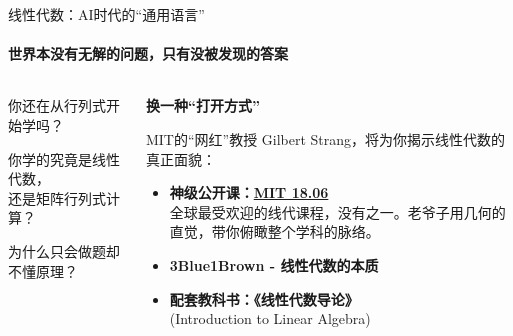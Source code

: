 \documentclass{beamer}
\newcommand{\hrefcol}[2]{\textcolor{cyan}{\href{#1}{#2}}}
\begin{document}
\begin{frame}{线性代数：AI时代的“通用语言”}
\framesubtitle{世界本没有无解的问题，只有没被发现的答案}
    \begin{columns}[T]
        \begin{column}{0.5\textwidth}
            \vspace{1cm}
            \huge 你还在从\alert{行列式}开始学吗？
            
            \vfill

            \begin{flushright}
                \large
                你学的究竟是\alert{线性代数}，\\
                还是矩阵行列式\alert{计算}？
            \end{flushright}

            \vfill
            
            \huge 为什么只会\alert{做题}却不懂\alert{原理}？

            \vfill
            

        \end{column}
        
        \begin{column}{0.5\textwidth}
            \begin{center}
                \Large \textbf{换一种“打开方式”}
            \end{center}
            \vspace{0.3cm}
            MIT的“网红”教授 Gilbert Strang，将为你揭示线性代数的真正面貌：
            
            \begin{itemize}
                \item \textbf{神级公开课：\hrefcol{https://ocw.mit.edu/courses/18-06sc-linear-algebra-fall-2011/pages/syllabus/}{MIT 18.06}} \\
                \small 全球最受欢迎的线代课程，没有之一。老爷子用几何的直觉，带你俯瞰整个学科的脉络。
                \item \textbf{3Blue1Brown - 线性代数的本质}
                \item \textbf{配套教科书：《线性代数导论》} \\
                \small (Introduction to Linear Algebra) \\
            \end{itemize}

        \end{column}
    \end{columns}
\end{frame}
\end{document}
